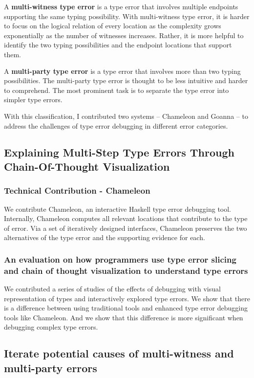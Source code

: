 A \textbf{multi-witness type error} is a type error that involves multiple endpoints supporting the same typing possibility. With multi-witness type error, it is harder to focus on the logical relation of every location as the complexity grows exponentially as the number of witnesses increases. Rather, it is more helpful to identify the two typing possibilities and the endpoint locations that support them.

A \textbf{multi-party type error} is a type error that involves more than two typing possibilities. The multi-party type error is thought to be less intuitive and harder to comprehend. The most prominent task is to separate the type error into simpler type errors. 


With this classification, I contributed two systems -- Chameleon and Goanna -- to address the challenges of type error debugging in different error categories.

\subsection{Explaining Multi-Step Type Errors Through Chain-Of-Thought Visualization}

\subsubsection{Technical Contribution - Chameleon}
We contribute Chameleon, an interactive Haskell type error debugging tool. Internally, Chameleon computes all relevant locations that contribute to the type of error. Via a set of iteratively designed interfaces, Chameleon preserves the two alternatives of the type error and the supporting evidence for each.

\subsubsection{An evaluation on how programmers use type error slicing and chain of thought visualization to understand type errors}
We contributed a series of studies of the effects of debugging with visual representation of types and interactively explored type errors. We show that there is a difference between using traditional tools and enhanced type error debugging tools like Chameleon. And we show that this difference is more significant when debugging complex type errors.

\subsection{Iterate potential causes of multi-witness and multi-party errors}


